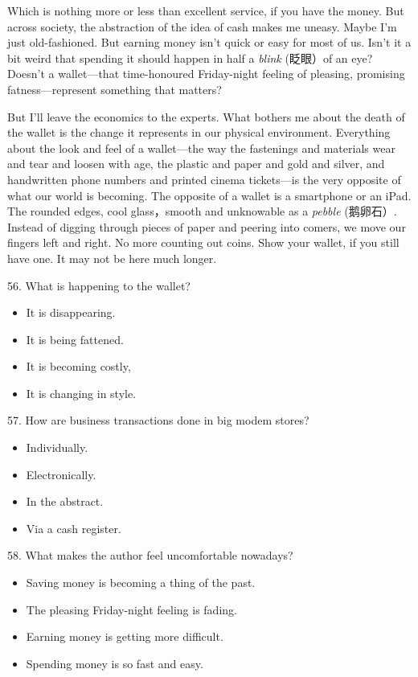 \documentclass[UTF8,11pt]{ctexart}
\begin{document}
Which is nothing more or less than excellent service, if you have the money. But across society, the abstraction of the idea of cash makes me uneasy. Maybe I’m just old-fashioned. But earning money isn’t quick or easy for most of us. Isn’t it a bit weird that spending it should happen in half a\textit{ blink} (眨眼）of an eye? Doesn’t a wallet—that time-honoured Friday-night feeling of pleasing, promising fatness—represent something that matters?


But I’ll leave the economics to the experts. What bothers me about the death of the wallet is the change it represents in our physical environment. Everything about the look and feel of a wallet—the way the fastenings and materials wear and tear and loosen with age, the plastic and paper and gold and silver, and handwritten phone numbers and printed cinema tickets—is the very opposite of what our world is becoming. The opposite of a wallet is a smartphone or an iPad. The rounded edges, cool glass，smooth and unknowable as a\textit{ pebble} (鹅卵石）. Instead of digging through pieces of paper and peering into comers, we move our fingers left and right. No more counting out coins. Show your wallet, if you still have one. It may not be here much longer.


56. What is happening to the wallet?


\begin{itemize}[leftmargin=2em,itemsep=.2em,topsep=.4em]\item[A.] It is disappearing.
\item[B.] It is being fattened.
\item[C.] It is becoming costly,
\item[D.] It is changing in style.
\end{itemize}

57. How are business transactions done in big modem stores?


\begin{itemize}[leftmargin=2em,itemsep=.2em,topsep=.4em]\item[A.] Individually.
\item[B.] Electronically.
\item[C.] In the abstract.
\item[D.] Via a cash register.
\end{itemize}

58. What makes the author feel uncomfortable nowadays?


\begin{itemize}[leftmargin=2em,itemsep=.2em,topsep=.4em]\item[A.] Saving money is becoming a thing of the past.
\item[B.] The pleasing Friday-night feeling is fading.
\item[C.] Earning money is getting more difficult.
\item[D.] Spending money is so fast and easy.
\end{itemize}
\end{document}

